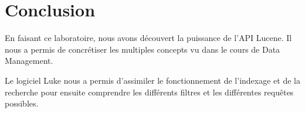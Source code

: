 \chapter{Conclusion}

En faisant ce laboratoire, nous avons découvert la puissance de l'API Lucene. Il nous a permis de concrétiser les multiples concepts vu dans le cours de Data Management.

Le logiciel Luke nous a permis d'assimiler le fonctionnement de l'indexage et de la recherche pour ensuite comprendre les différents filtres et les différentes requêtes possibles.